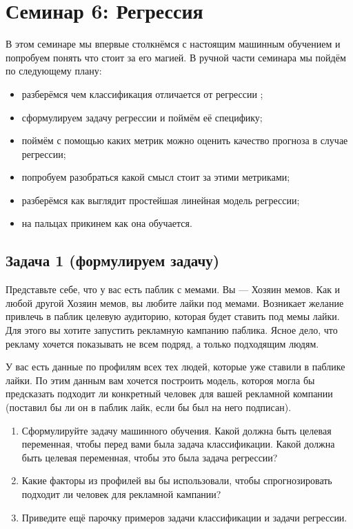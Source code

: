 \documentclass[12pt, a4paper, oneside]{article}
\begin{document}
	
\section*{Семинар 6: Регрессия}

В этом семинаре мы впервые столкнёмся с настоящим машинным обучением и попробуем понять что стоит за его магией. В ручной части семинара мы пойдём по следующему  плану: 

\begin{itemize}
	\item разберёмся чем классификация отличается от регрессии ;
	\item сформулируем задачу регрессии и поймём её специфику;
	\item поймём с помощью каких метрик можно оценить качество прогноза в случае регрессии;
	\item попробуем разобраться какой смысл стоит за этими метриками;
	\item разберёмся как выглядит простейшая линейная модель регрессии;
	\item на пальцах прикинем как она обучается.
\end{itemize}


\subsection*{Задача 1 (формулируем задачу)}

Представьте себе, что у вас есть паблик с мемами. Вы --- Хозяин мемов. Как и любой другой Хозяин мемов, вы любите лайки под мемами. Возникает желание привлечь в паблик целевую аудиторию, которая будет ставить под мемы лайки. Для этого вы хотите запустить рекламную кампанию паблика. Ясное дело, что рекламу хочется показывать не всем подряд,  а только подходящим людям. 

У вас есть данные по профилям всех тех людей, которые уже ставили в паблике лайки. По этим данным вам хочется построить модель, котороя могла бы предсказать подходит ли конкретный человек для вашей рекламной компании (поставил бы ли он в паблик лайк, если бы был на него подписан). 

\begin{enumerate}
\item Сформулируйте задачу машинного обучения. Какой должна быть целевая переменная, чтобы перед вами была задача классификации. Какой должна быть целевая переменная, чтобы это была задача регрессии? 

\item Какие факторы из профилей вы бы использовали, чтобы спрогнозировать подходит ли человек для рекламной кампании?

\item Приведите ещё парочку примеров задачи классификации и задачи регрессии. 
\end{enumerate}
\end{document}
